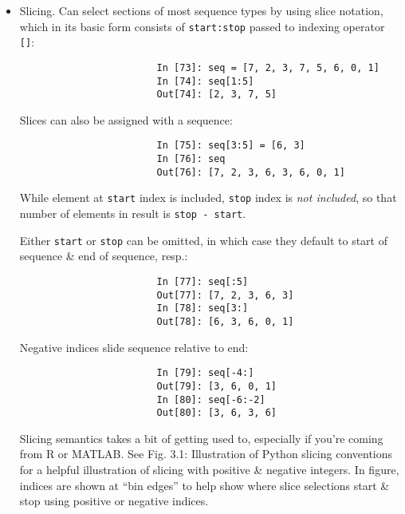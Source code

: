 \documentclass{article}
\begin{document}
\begin{enumerate}
\begin{itemize}
\begin{itemize}
\begin{itemize}
\begin{itemize}
					\begin{verbatim}
						In [70]: b = ["saw", "small", "He", "foxes", "six"]
						In [71]: b.sort(key=len)
						In [72]: b
						Out[72]: ['He', 'saw', 'six', 'small', 'foxes']
					\end{verbatim}
					{\tt sorted} function can produce a sorted copy of a general sequence.
					\item {\sf Slicing.} Can select sections of most sequence types by using slice notation, which in its basic form consists of {\tt start:stop} passed to indexing operator {\tt[]}:
					\begin{verbatim}
						In [73]: seq = [7, 2, 3, 7, 5, 6, 0, 1]
						In [74]: seq[1:5]
						Out[74]: [2, 3, 7, 5]
					\end{verbatim}
					Slices can also be assigned with a sequence:
					\begin{verbatim}
						In [75]: seq[3:5] = [6, 3]
						In [76]: seq
						Out[76]: [7, 2, 3, 6, 3, 6, 0, 1]
					\end{verbatim}
					While element at {\tt start} index is included, {\tt stop} index is {\it not included}, so that number of elements in result is {\tt stop - start}.
					
					Either {\tt start} or {\tt stop} can be omitted, in which case they default to start of sequence \& end of sequence, resp.:
					\begin{verbatim}
						In [77]: seq[:5]
						Out[77]: [7, 2, 3, 6, 3]
						In [78]: seq[3:]
						Out[78]: [6, 3, 6, 0, 1]
					\end{verbatim}
					Negative indices slide sequence relative to end:
					\begin{verbatim}
						In [79]: seq[-4:]
						Out[79]: [3, 6, 0, 1]
						In [80]: seq[-6:-2]
						Out[80]: [3, 6, 3, 6]
					\end{verbatim}
					Slicing semantics takes a bit of getting used to, especially if you're coming from R or MATLAB. See {\sf Fig. 3.1: Illustration of Python slicing conventions} for a helpful illustration of slicing with positive \& negative integers. In figure, indices are shown at ``bin edges'' to help show where slice selections start \& stop using positive or negative indices.
					

\end{itemize}
\end{itemize}
\end{itemize}
\end{itemize}
\end{enumerate}
\end{document}
